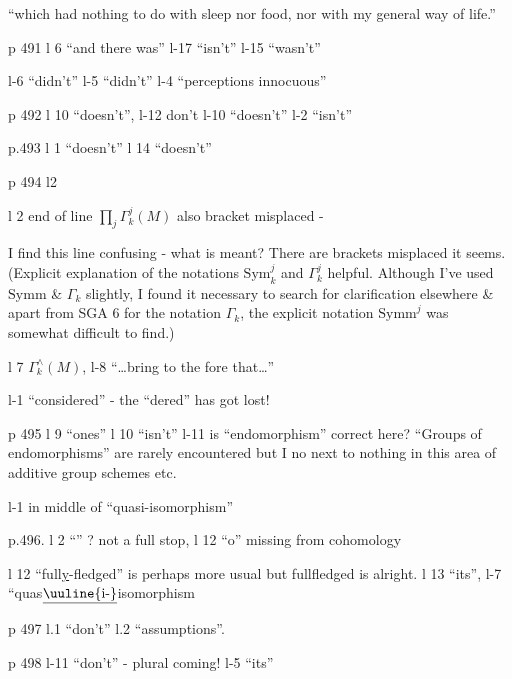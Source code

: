 ``which had nothing to do with sleep nor food, nor with my general way of life.''

p 491 l 6 ``and there was'' \quad l-17 ``isn't'' \quad l-15 ``wasn't''

l-6 ``didn't'' \quad l-5 ``didn't'' \quad l-4 ``perceptions innocuous''

p 492 l 10 ``doesn't'', \quad l-12 don't \quad l-10 ``doesn't'' \quad l-2 ``isn't''

p.493 l 1 ``doesn't'' \quad l 14 ``doesn't''

p 494 l2 

l 2 end of line $\prod\limits_{j}\Gamma_{k}^{j}(M)$ \quad also bracket misplaced -

\unsure{---} I find this line confusing - what is meant? There are brackets misplaced it seems. (Explicit explanation of the notations $\mathrm{Sym}_{k}^{j}$ and $\Gamma_{k}^{j}$   helpful. Although I've used $\mathrm{Symm}$ \& $\Gamma_{k}$\unsure{\deleted{,}|;|,} slightly, I  found  it necessary to search for clarification elsewhere \& apart from SGA 6 for the notation $\Gamma_{k}$, the explicit notation  $\mathrm{Symm}^{j}$ was somewhat difficult to find.)

l 7 $\Gamma_{k}^{\wedge}(M)$, \quad l-8 ``\ldots{}bring to the fore that\ldots''

l-1 ``considered'' - the ``dered'' has got lost!


p 495 l 9 ``ones'' \quad l 10 ``isn't'' \quad l-11 is ``endomorphism'' correct here? ``Groups of endomorphisms'' are rarely encountered but I no next to nothing in this area of additive group schemes etc.

l-1 \unsure{-|$\leftarrow$} in middle of ``quasi-isomorphism''

p.496. l 2 ``'' ? not a full stop, \quad l 12 ``o'' missing from cohomology

l 12 ``full\uline{y}-fledged'' is perhaps more usual but fullfledged is alright. \quad l 13 ``its'', \quad l-7 ``quas$\underline{\text{\uuline{i-}}}$isomorphism

p 497 l.1 ``don't'' \quad l.2 ``assumptions''.

p 498 l-11 ``don't'' - plural coming! \quad l-5 ``its''

